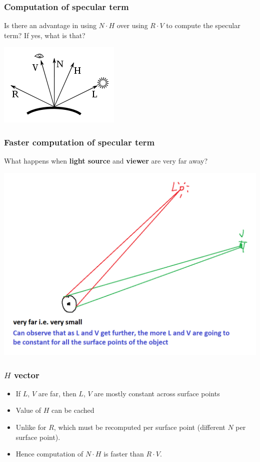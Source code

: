 \documentclass{beamer}
\begin{document}
\begin{frame}
    \frametitle{Computation of specular term}

    Is there an advantage in using $N \cdot H$ over using $R \cdot V$ to compute the specular term? 
    If yes, what is that?

    \begin{center}
        \includegraphics[]{blinn-phong.png}
    \end{center}

\end{frame}

\begin{frame}
    \frametitle{Faster computation of specular term}

    What happens when \textbf{light source} and \textbf{viewer} are very far away?

    \begin{center}
        \includegraphics[scale=0.5]{NHvsRV.png}
    \end{center}

\end{frame}

\begin{frame}
    \frametitle{$H$ vector}

    \begin{itemize}
        \item If $L$, $V$ are far, then $L$, $V$ are mostly constant across surface points
        \item Value of $H$ can be cached
        \item Unlike for $R$, which must be recomputed per surface point (different $N$ per surface point).
        \item Hence computation of $N \cdot H$ is faster than $R \cdot V$.
    \end{itemize}

\end{frame}
\end{document}
